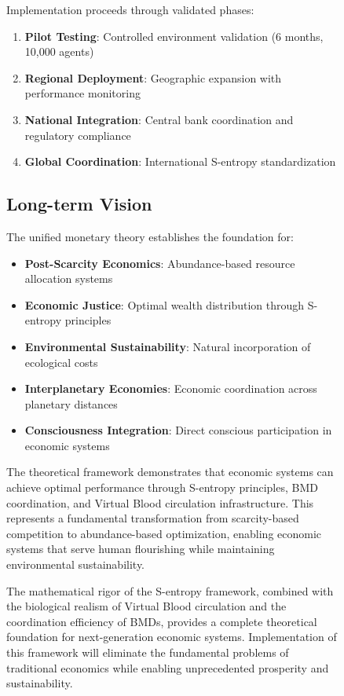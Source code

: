 \begin{figure}[h]
    Implementation proceeds through validated phases:
    
    \begin{enumerate}
    \item \textbf{Pilot Testing}: Controlled environment validation (6 months, 10,000 agents)
    \item \textbf{Regional Deployment}: Geographic expansion with performance monitoring
    \item \textbf{National Integration}: Central bank coordination and regulatory compliance
    \item \textbf{Global Coordination}: International S-entropy standardization
    \end{enumerate}
    
    \subsection{Long-term Vision}
    
    The unified monetary theory establishes the foundation for:
    
    \begin{itemize}
    \item \textbf{Post-Scarcity Economics}: Abundance-based resource allocation systems
    \item \textbf{Economic Justice}: Optimal wealth distribution through S-entropy principles
    \item \textbf{Environmental Sustainability}: Natural incorporation of ecological costs
    \item \textbf{Interplanetary Economies}: Economic coordination across planetary distances
    \item \textbf{Consciousness Integration}: Direct conscious participation in economic systems
    \end{itemize}
    
    The theoretical framework demonstrates that economic systems can achieve optimal performance through S-entropy principles, BMD coordination, and Virtual Blood circulation infrastructure. This represents a fundamental transformation from scarcity-based competition to abundance-based optimization, enabling economic systems that serve human flourishing while maintaining environmental sustainability.
    
    The mathematical rigor of the S-entropy framework, combined with the biological realism of Virtual Blood circulation and the coordination efficiency of BMDs, provides a complete theoretical foundation for next-generation economic systems. Implementation of this framework will eliminate the fundamental problems of traditional economics while enabling unprecedented prosperity and sustainability.
    

\end{figure}
